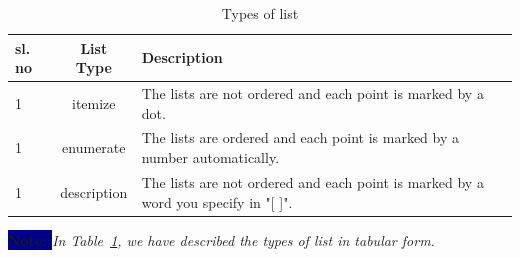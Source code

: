 \documentclass{article}
\begin{document}
\begin{table}                   %
    \centering
    \begin{tabular}{| l| c |p{5cm} |}
        \hline
         sl. no & List Type & Description \\
         \hline
         1 & itemize & The lists are not ordered and each point is marked by a dot. \\
         1 & enumerate & The lists are ordered and each point is marked by a number automatically. \\
         1 & description & The lists are not ordered and each point is marked by a word you specify in "[ ]". \\
         \hline
         
    \end{tabular}
    \caption{Types of list}
    \label{tab:Types of lists}
\end{table}

\textbf{\colorbox{darkBlue}{\textcolor{faintBlue}{Note: }}}\textit{In Table~\ref{tab:Types of lists}, we have described the types of list in tabular form.}



\end{document}
